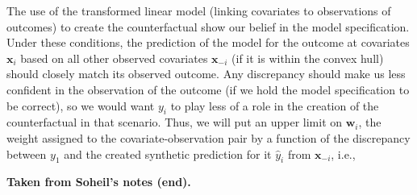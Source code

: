 \documentclass[11pt]{article}
\newcommand{\w}{\textbf{w}}
\newcommand{\x}{\textbf{x}}
\begin{document}
The use of the transformed linear model (linking covariates to observations of 
outcomes) to create the counterfactual show our belief in the model 
specification. Under these conditions, the prediction of the model for the 
outcome at covariates $\x_i$ based on all other observed covariates $\x_{-i}$ 
(if it is within the convex hull) should closely match its observed outcome.  
Any discrepancy should make us less confident in the observation of the 
outcome (if we hold the model specification to be correct), so we would want 
$y_i$ to play less of a role in the creation of the counterfactual in that 
scenario.  Thus, we will put an upper limit on $\w_i$, the weight assigned to 
the covariate-observation pair by a function of the discrepancy between $y_1$ 
and the created synthetic prediction for it $\hat{y}_i$ from $\x_{-i}$, i.e., 





 
{\bf Taken from Soheil's notes (end).} \\



\end{document}
